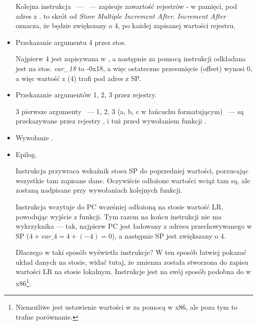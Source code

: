 \begin{itemize}
Kolejna instrukcja ~---  ~--- zapisuje zawartość rejestrów - w pamięci, pod adres z .
 to skrót od \emph{Store Multiple Increment After}.
\emph{Increment After} oznacza, że  będzie zwiększany o 4, po każdej zapisanej wartości rejestru.

\item Przekazanie argumentu 4 przez stos.

Najpierw 4 jest zapisywana w , a następnie za pomocą instrukcji  odkładana jest na stos.
\emph{var\_18} to -0x18, a więc ostateczne przesunięcie (offset) wynosi 0, a więc wartość z  (4) trafi pod adres z \ac{SP}.

\item Przekazanie argumentów 1, 2, 3 przez rejestry.

3 pierwsze argumenty ~--- 1, 2, 3 (a, b, c w łańcuchu formatującym) ~--- są przekazywane przez rejestry ,  i 
tuż przed wywołaniem funkcji \printf.

\item Wywołanie \printf.

\item Epilog.

Instrukcja  przywraca wskaźnik stosu \ac{SP} do poprzedniej wartości,
porzucając wszystkie tam zapisane dane.
Oczywiście odłożone wartości wciąż tam są, ale zostaną nadpisane przy wywołaniach kolejnych funkcji.

Instrukcja  wczytuje do \ac{PC} wcześniej odłożoną na stosie wartość \ac{LR}, powodując wyjście z funkcji.
Tym razem na końcu instrukcji nie ma wykrzyknika --- tak, najpierw \ac{PC} jest ładowany z adresu przechowywanego w \ac{SP}
($4+var\_4=4+(-4)=0$), a następnie \ac{SP} jest zwiększany o 4.


Dlaczego \IDA w taki sposób wyświetla instrukcje?
W ten sposób łatwiej pokazać układ danych na stosie, widać tutaj, że zmienna  została stworzona do zapisu wartości \ac{LR} na stosie lokalnym.
Instrukcje jest na swój sposób podobna do  w x86\footnote{Niemożliwe jest ustawienie wartości w  za pomocą \POP w x86, ale poza tym to trafne porównanie.}.

\end{itemize}

\myparagraph{\OptimizingKeilVI: \ThumbMode}


